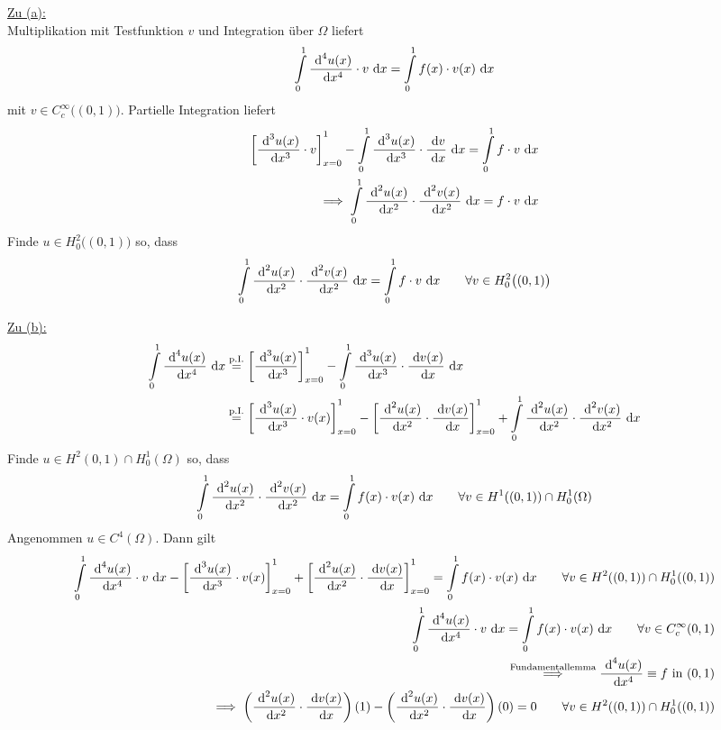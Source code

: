 \documentclass[12pt,a4paper]{article}
\begin{document}
\begin{lösung}
\underline{Zu (a):}\\
Multiplikation mit Testfunktion $v$ und Integration über $\Omega$ liefert
\begin{align*}
\int\limits_0^1 \frac{\text{ d}^4 u(x)}{\text{ d} x^4}\cdot v\text{ d} x=\int\limits_0^1 f(x)\cdot v(x)\text{ d} x
\end{align*}
mit $v\in C_c^\infty\big((0,1)\big)$. Partielle Integration liefert
\begin{align*}
\left[\frac{\text{ d}^3 u(x)}{\text{ d} x^3}\cdot v\right]_{x=0}^1
-\int\limits_0^1 \frac{\text{ d}^3 u(x)}{\text{ d} x^3}\cdot\frac{\text{ d} v}{\text{ d} x}\text{ d} x=\int\limits_0^1 f\cdot v\text{ d} x\\
\implies
\int\limits_0^1 \frac{\text{ d}^2 u(x)}{\text{ d} x^2}\cdot\frac{\text{ d}^2 v(x)}{\text{ d} x^2}\text{ d} x= f\cdot v\text{ d} x
\end{align*}
Finde $u\in H^2_0\big((0,1)\big)$ so, dass
\begin{align*}
\int\limits_0^1 \frac{\text{ d}^2 u(x)}{\text{ d} x^2}\cdot\frac{\text{ d}^2 v(x)}{\text{ d} x^2}\text{ d} x=\int\limits_0^1 f\cdot v\text{ d} x\qquad\forall v\in H_0^2\big((0,1)\big)
\end{align*}

\underline{Zu (b):}
\begin{align*}
\int\limits_0^1 \frac{\text{ d}^4 u(x)}{\text{ d} x^4}\text{ d} x
&\stackrel{\text{p.I.}}{=}
\left[\frac{\text{ d}^3 u(x)}{\text{ d} x^3}\right]_{x=0}^1-\int\limits_0^1 \frac{\text{ d}^3 u(x)}{\text{ d} x^3}\cdot\frac{\text{ d} v(x)}{\text{ d} x}\text{ d} x\\
&\stackrel{\text{p.I.}}{=}
\left[\frac{\text{ d}^3 u(x)}{\text{ d} x^3}\cdot v(x)\right]_{x=0}^1- 
\left[\frac{\text{ d}^2 u(x)}{\text{ d} x^2}\cdot\frac{\text{ d} v(x)}{\text{ d} x}\right]_{x=0}^1
+\int\limits_0^1 \frac{\text{ d}^2 u(x)}{\text{ d} x^2}\cdot\frac{\text{ d}^2 v(x)}{\text{ d} x^2}\text{ d} x\\
\end{align*}
Finde $u\in H^2(0,1)\cap H^1_0(\Omega)$ so, dass
\begin{align*}
\int\limits_0^1 \frac{\text{ d}^2 u(x)}{\text{ d} x^2}\cdot\frac{\text{ d}^2 v(x)}{\text{ d} x^2}\text{ d} x=\int\limits_0^1 f(x)\cdot v(x)\text{ d} x\qquad\forall v\in H^1((0,1))\cap H^1_0(\Omega)
\end{align*}
Angenommen $u\in C^4(\Omega)$. Dann gilt
\begin{align*}
\int\limits_0^1 \frac{\text{ d}^4 u(x)}{\text{ d} x^4}\cdot v\text{ d} x-\left[\frac{\text{ d}^3 u(x)}{\text{ d} x^3}\cdot v(x)\right]_{x=0}^1+\left[\frac{\text{ d}^2 u(x)}{\text{ d} x^2}\cdot\frac{\text{ d} v(x)}{\text{ d} x}\right]_{x=0}^1=\int\limits_0^1 f(x)\cdot v(x)\text{ d} x
\qquad\forall v\in H^2((0,1))\cap H_0^1((0,1))\\
\int\limits_0^1 \frac{\text{ d}^4 u(x)}{\text{ d} x^4}\cdot v\text{ d} x
=\int\limits_0^1 f(x)\cdot v(x)\text{ d} x\qquad\forall v\in C_c^\infty(0,1)\\
\stackrel{\text{Fundamentallemma}}{\implies}
\frac{\text{ d}^4 u(x)}{\text{ d} x^4}\equiv f\text{ in }(0,1)\\
\implies
\left(\frac{\text{ d}^2 u(x)}{\text{ d} x^2}\cdot\frac{\text{ d} v(x)}{\text{ d} x}\right)(1)-\left(\frac{\text{ d}^2 u(x)}{\text{ d} x^2}\cdot\frac{\text{ d} v(x)}{\text{ d} x}\right)(0)=0\qquad\forall v\in H^2((0,1))\cap H^1_0((0,1))
\end{align*}


\end{lösung}
\end{document}
